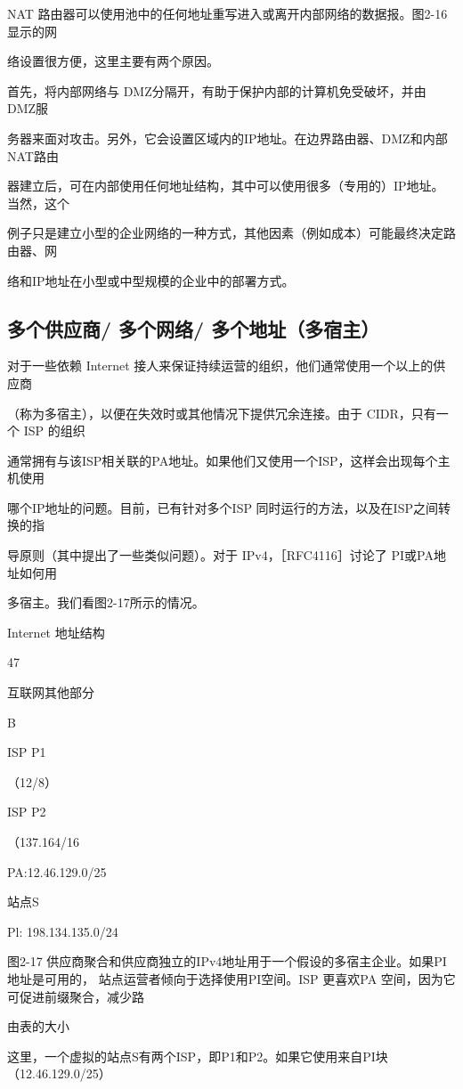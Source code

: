 NAT 路由器可以使用池中的任何地址重写进入或离开内部网络的数据报。图2-16显示的网

络设置很方便，这里主要有两个原因。

首先，将内部网络与 DMZ分隔开，有助于保护内部的计算机免受破坏，并由 DMZ服

务器来面对攻击。另外，它会设置区域内的IP地址。在边界路由器、DMZ和内部 NAT路由

器建立后，可在内部使用任何地址结构，其中可以使用很多（专用的）IP地址。当然，这个

例子只是建立小型的企业网络的一种方式，其他因素（例如成本）可能最终决定路由器、网

络和IP地址在小型或中型规模的企业中的部署方式。

\subsection{多个供应商/ 多个网络/ 多个地址（多宿主）}
对于一些依赖 Internet 接人来保证持续运营的组织，他们通常使用一个以上的供应商

（称为多宿主），以便在失效时或其他情况下提供冗余连接。由于 CIDR，只有一个 ISP 的组织

通常拥有与该ISP相关联的PA地址。如果他们又使用一个ISP，这样会出现每个主机使用

哪个IP地址的问题。目前，已有针对多个ISP 同时运行的方法，以及在ISP之间转换的指

导原则（其中提出了一些类似问题）。对于 IPv4，［RFC4116］讨论了 PI或PA地址如何用

多宿主。我们看图2-17所示的情况。

Internet 地址结构

47

互联网其他部分

B

ISP P1

（12/8）

ISP P2

（137.164/16

PA:12.46.129.0/25

站点S

Pl: 198.134.135.0/24

图2-17 供应商聚合和供应商独立的IPv4地址用于一个假设的多宿主企业。如果PI 地址是可用的，
站点运营者倾向于选择使用PI空间。ISP 更喜欢PA 空间，因为它可促进前缀聚合，减少路

由表的大小

这里，一个虚拟的站点S有两个ISP，即P1和P2。如果它使用来自PI块（12.46.129.0/25）

